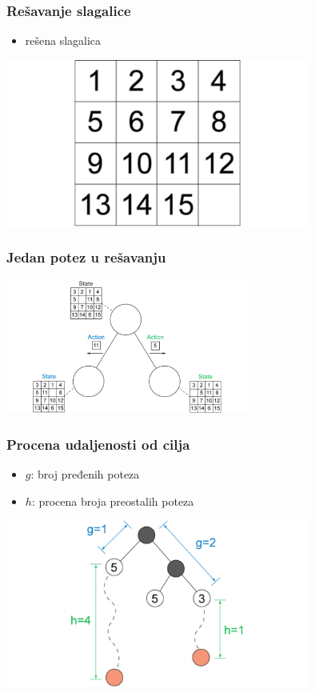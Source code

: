 \documentclass[compress,aspectratio=169]{beamer}
\begin{document}
\begin{frame}[fragile]
  \frametitle{Rešavanje slagalice}
  \begin{itemize}
    \item rešena slagalica
  \end{itemize}
  \begin{center}
    \includegraphics[width=10cm]{prj-01-pic03.pdf}
  \end{center}
\end{frame}

\begin{frame}[fragile]
  \frametitle{Jedan potez u rešavanju}
  \begin{center}
    \includegraphics[width=8cm]{prj-01-pic04.png}
  \end{center}
\end{frame}

\begin{frame}[fragile]
  \frametitle{Procena udaljenosti od cilja}
  \begin{itemize}
    \item $g$: broj pređenih poteza
    \item $h$: procena broja preostalih poteza
  \end{itemize}
  \begin{center}
    \includegraphics[width=10cm]{prj-01-pic05.png}
  \end{center}
\end{frame}
\end{document}
